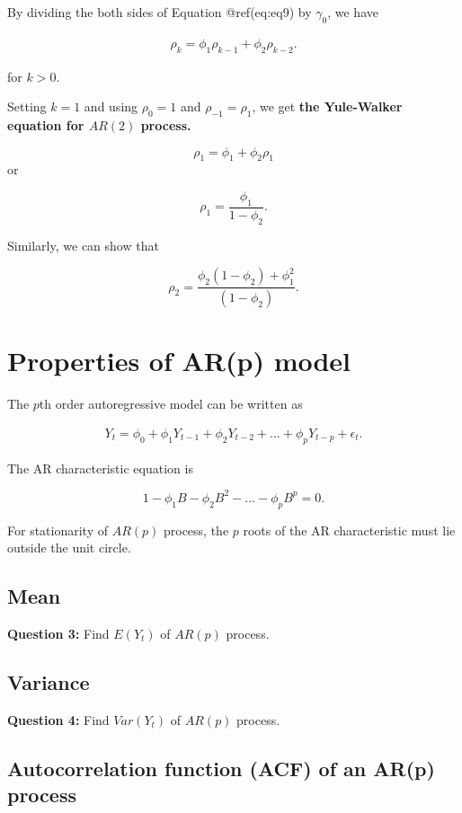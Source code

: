 \documentclass[
  11pt,
  a4paper,
]{report}
\begin{document}
By dividing the both sides of Equation @ref(eq:eq9) by \(\gamma_0\), we
have

\begin{align}
 \rho_k=\phi_1\rho_{k-1}+\phi_2\rho_{k-2}.
\end{align}

for \(k>0\).

Setting \(k=1\) and using \(\rho_0=1\) and \(\rho_{-1}=\rho_1\), we get
\textbf{the Yule-Walker equation for \(AR(2)\) process.}

\[\rho_1=\phi_1+\phi_2 \rho_1\] or

\[\rho_1 = \frac{\phi_1}{1-\phi_2}.\]

Similarly, we can show that

\[\rho_2 = \frac{\phi_2(1-\phi_2)+\phi_1^2}{(1-\phi_2)}.\]

\section{Properties of AR(p) model}\label{properties-of-arp-model}

The \(p\)th order autoregressive model can be written as

\begin{align}
Y_t = \phi_0 + \phi_1Y_{t-1}+\phi_2 Y_{t-2}+ ... + \phi_p Y_{t-p}+\epsilon_t.
\end{align}

The AR characteristic equation is

\[1-\phi_1B-\phi_2B^2-...-\phi_pB^p=0.\]

For stationarity of \(AR(p)\) process, the \(p\) roots of the AR
characteristic must lie outside the unit circle.

\subsection{Mean}\label{mean-2}

\textbf{Question 3: } Find \(E(Y_t)\) of \(AR(p)\) process.

\subsection{Variance}\label{variance-1}

\textbf{Question 4: } Find \(Var(Y_t)\) of \(AR(p)\) process.

\subsection{Autocorrelation function (ACF) of an AR(p)
process}\label{autocorrelation-function-acf-of-an-arp-process}
\end{document}
